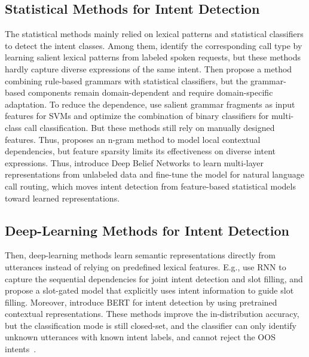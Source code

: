 \documentclass[11pt]{article}
\begin{document}
\subsection{Statistical Methods for Intent Detection}
The statistical methods mainly relied on lexical patterns and statistical classifiers to detect the intent classes. Among them, \citet{gorin1997how} identify the corresponding call type by learning salient lexical patterns from labeled spoken requests, but these methods hardly capture diverse expressions of the same intent. Then \citet{wang2002combination} propose a method combining rule-based grammars with statistical classifiers, but the grammar-based components remain domain-dependent and require domain-specific adaptation. To reduce the dependence, \citet{haffner2003optimizing} use salient grammar fragments as input features for SVMs and optimize the combination of binary classifiers for multi-class call classification. But these methods still rely on manually designed features. Thus, \citet{tur2010what} proposes an n-gram method to model local contextual dependencies, but feature sparsity limits its effectiveness on diverse intent expressions. Thus, \citet{sarikaya2011deep} introduce Deep Belief Networks to learn multi-layer representations from unlabeled data and fine-tune the model for natural language call routing, which moves intent detection from feature-based statistical models toward learned representations.

\subsection{Deep-Learning Methods for Intent Detection}
Then, deep-learning methods learn semantic representations directly from utterances instead of relying on predefined lexical features. E.g., \citet{liu2016attention} use RNN to capture the sequential dependencies for joint intent detection and slot filling, and \citet{goo2018slot} propose a slot-gated model that explicitly uses intent information to guide slot filling. Moreover, \citet{chen2019bert} introduce BERT for intent detection by using pretrained contextual representations. These methods improve the in-distribution accuracy, but the classification mode is still closed-set, and the classifier can only identify unknown utterances with known intent labels, and cannot reject the OOS intents~\citep{hendrycks2017baseline, guo2017calibration}. 
\end{document}
